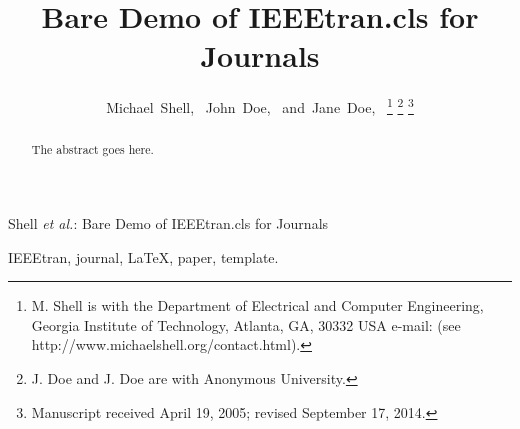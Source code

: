 \documentclass[journal]{IEEEtran}
\begin{document}
%
\title{Bare Demo of IEEEtran.cls for Journals}
%
%
%

\author{Michael~Shell,~
	John~Doe,~
	and~Jane~Doe,~%
	\thanks{M. Shell is with the Department
		of Electrical and Computer Engineering, Georgia Institute of Technology, Atlanta,
		GA, 30332 USA e-mail: (see http://www.michaelshell.org/contact.html).}%
	\thanks{J. Doe and J. Doe are with Anonymous University.}%
	\thanks{Manuscript received April 19, 2005; revised September 17, 2014.}}

%
{Shell \MakeLowercase{\textit{et al.}}: Bare Demo of IEEEtran.cls for Journals}
%


\maketitle

\begin{abstract}
	The abstract goes here.
\end{abstract}

\begin{IEEEkeywords}
	IEEEtran, journal, \LaTeX, paper, template.
\end{IEEEkeywords}
\end{document}
